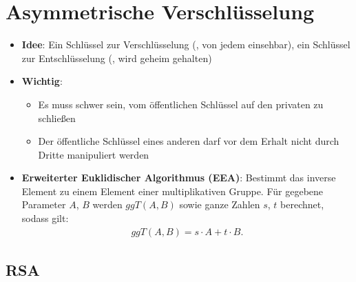 \section{Asymmetrische Verschlüsselung}%
\label{asver:sec:asymmetrische_verschluesselung}

\begin{itemize}
	\item \textbf{Idee}: Ein Schlüssel zur Verschlüsselung (, von jedem einsehbar), ein Schlüssel zur Entschlüsselung (, wird geheim gehalten)
	\item \textbf{Wichtig}:
	\begin{itemize}
		\item Es muss schwer sein, vom öffentlichen Schlüssel auf den privaten zu schließen
		\item Der öffentliche Schlüssel eines anderen darf vor dem Erhalt nicht durch Dritte manipuliert werden
	\end{itemize}
	\item \textbf{Erweiterter Euklidischer Algorithmus (EEA)}: Bestimmt das inverse Element zu einem Element einer multiplikativen Gruppe. Für gegebene Parameter $A$, $B$ werden $ggT(A, B)$ sowie ganze Zahlen $s$, $t$ berechnet, sodass gilt:\\
	\begin{align*}
		ggT(A, B) = s \cdot A + t \cdot B\text{.}
	\end{align*}
\end{itemize}

\subsection{RSA}%
\label{asver:sub:rsa}

